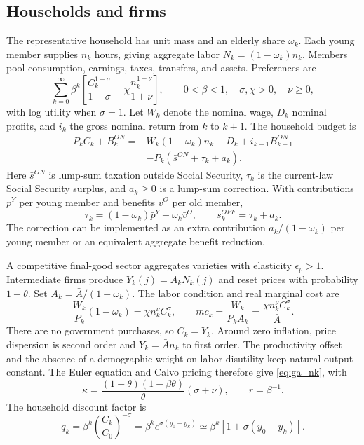 \documentclass[12pt]{article}%
\theoremstyle{remark}
\begin{document}
\subsection{Households and firms}
The representative household has unit mass and an elderly share $\omega_k$. Each young member supplies $n_k$ hours, giving aggregate labor $N_k=(1-\omega_k)n_k$. Members pool consumption, earnings, taxes, transfers, and assets. Preferences are
\begin{equation}
 \sum_{k=0}^{\infty}\beta^k
 \left[\frac{C_k^{1-\sigma}}{1-\sigma}
 -\chi\frac{n_k^{1+\nu}}{1+\nu}\right],
 \qquad 0<\beta<1,\quad \sigma,\chi>0,\quad\nu\geq0,
 \label{eq:ga_preferences}
\end{equation}
with log utility when $\sigma=1$. Let $W_k$ denote the nominal wage, $D_k$ nominal profits, and $i_k$ the gross nominal return from $k$ to $k+1$. The household budget is
\begin{equation}
 \begin{split}
 P_kC_k+B_k^{ON}={}&W_k(1-\omega_k)n_k+D_k
 +i_{k-1}B_{k-1}^{ON}\\
 &-P_k(\bar s^{ON}+\tau_k+a_k).
 \end{split}
 \label{eq:ga_hh_budget}
\end{equation}
Here $\bar s^{ON}$ is lump-sum taxation outside Social Security, $\tau_k$ is the current-law Social Security surplus, and $a_k\geq0$ is a lump-sum correction. With contributions $\bar p^Y$ per young member and benefits $\bar v^O$ per old member,
\begin{equation}
 \tau_k=(1-\omega_k)\bar p^Y-\omega_k\bar v^O,
 \qquad s_k^{OFF}=\tau_k+a_k.
 \label{eq:ga_ss_balance}
\end{equation}
The correction can be implemented as an extra contribution $a_k/(1-\omega_k)$ per young member or an equivalent aggregate benefit reduction.

A competitive final-good sector aggregates varieties with elasticity $\epsilon_p>1$. Intermediate firms produce $Y_k(j)=A_kN_k(j)$ and reset prices with probability $1-\theta$. Set $A_k=\bar A/(1-\omega_k)$. The labor condition and real marginal cost are
\begin{equation}
 \frac{W_k}{P_k}(1-\omega_k)=\chi n_k^\nu C_k^\sigma,
 \qquad mc_k=\frac{W_k}{P_kA_k}
 =\frac{\chi n_k^\nu C_k^\sigma}{\bar A}.
 \label{eq:ga_mc}
\end{equation}
There are no government purchases, so $C_k=Y_k$. Around zero inflation, price dispersion is second order and $Y_k=\bar A n_k$ to first order. The productivity offset and the absence of a demographic weight on labor disutility keep natural output constant. The Euler equation and Calvo pricing therefore give \eqref{eq:ga_nk}, with
\begin{equation}
 \kappa=\frac{(1-\theta)(1-\beta\theta)}{\theta}(\sigma+\nu),
 \qquad r=\beta^{-1}.
 \label{eq:ga_kappa}
\end{equation}
The household discount factor is
\begin{equation}
 q_k=\beta^k\left(\frac{C_k}{C_0}\right)^{-\sigma}
 =\beta^k e^{\sigma(y_0-y_k)}
 \simeq\beta^k[1+\sigma(y_0-y_k)].
 \label{eq:ga_sdf}
\end{equation}
\end{document}
